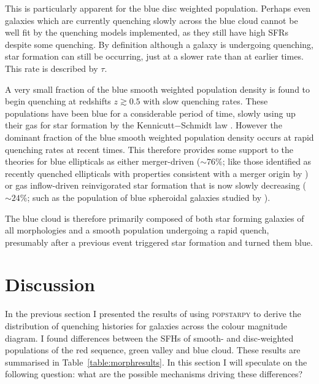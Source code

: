This is particularly apparent for the blue disc weighted population. Perhaps even galaxies which are currently quenching slowly across the blue cloud cannot be well fit by the quenching models implemented, as they still have high SFRs despite some quenching. By definition although a galaxy is undergoing quenching, star formation can still be occurring, just at a slower rate than at earlier times. This rate is described by $\tau$.

A very small fraction of the blue smooth weighted population density is found to begin quenching at redshifts $z \gtrsim 0.5 $ with slow quenching rates. These populations have been blue for a considerable period of time, slowly using up their gas for star formation by the Kennicutt$-$Schmidt law \citep{schmidt59, kennicutt97}. However the dominant fraction of the blue smooth weighted population density occurs at rapid quenching rates at recent times. This therefore provides some support to the theories for blue ellipticals as either merger-driven ($\sim76\%$; like those identified as recently quenched ellipticals with properties consistent with a merger origin by \citealt{McIntosh14}) or gas inflow-driven reinvigorated star formation that is now slowly decreasing ($\sim24\%$; such as the population of blue spheroidal galaxies studied by \citealt{Kaviraj13}).

The blue cloud is therefore primarily composed of both star forming galaxies of all morphologies and a smooth population undergoing a rapid quench, presumably after a previous event triggered star formation and turned them blue.


\section{Discussion}\label{morph:discussion}

In the previous section I presented the results of using \textsc{popstarpy} to derive the distribution of quenching histories for galaxies across the colour magnitude diagram. I  found differences between the SFHs of smooth- and disc-weighted populations of the red sequence, green valley and blue cloud. These results are summarised in Table~\ref{table:morphresults}. In this section I will speculate on the following question: what are the possible mechanisms driving these differences? 

